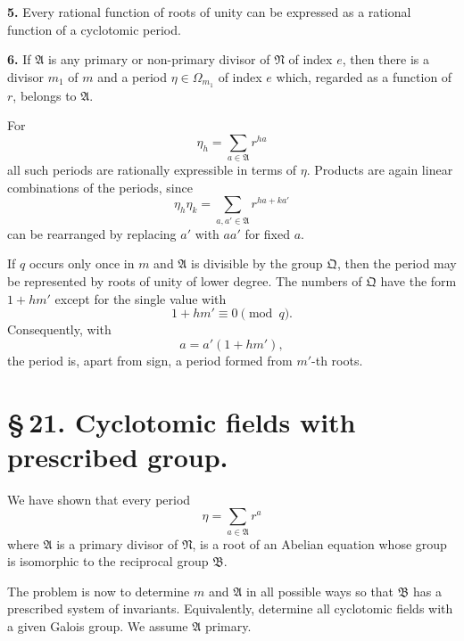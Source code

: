 \documentclass[11pt]{article}
\providecommand{\grpA}{\mathfrak A}
\providecommand{\grpB}{\mathfrak B}
\providecommand{\grpN}{\mathfrak N}
\providecommand{\grpQ}{\mathfrak Q}
\begin{document}
\medskip
\noindent\textbf{5.} Every rational function of roots of unity can be expressed as a rational function of a cyclotomic period.

\medskip
\noindent\textbf{6.} If $\grpA$ is any primary or non-primary divisor of $\grpN$ of index $e$, then there is a divisor $m_1$ of $m$ and a period $\eta\in\Omega_{m_1}$ of index $e$ which, regarded as a function of $r$, belongs to $\grpA$.

For
\[
 \eta_h=\sum_{a\in\grpA}r^{ha}
\]
all such periods are rationally expressible in terms of $\eta$. Products are again linear combinations of the periods, since
\[
 \eta_h\eta_k=\sum_{a,a'\in\grpA}r^{ha+ka'}
\]
can be rearranged by replacing $a'$ with $aa'$ for fixed $a$.

If $q$ occurs only once in $m$ and $\grpA$ is divisible by the group $\grpQ$, then the period may be represented by roots of unity of lower degree. The numbers of $\grpQ$ have the form $1+hm'$ except for the single value with
\begin{equation}
 1+hm'\equiv0\pmod q.
\tag{18}
\end{equation}
Consequently, with
\begin{equation}
 a=a'(1+hm'),
\tag{19}
\end{equation}
the period is, apart from sign, a period formed from $m'$-th roots.

\section*{\S\,21. Cyclotomic fields with prescribed group.}

We have shown that every period
\[
 \eta=\sum_{a\in\grpA}r^a
\]
where $\grpA$ is a primary divisor of $\grpN$, is a root of an Abelian equation whose group is isomorphic to the reciprocal group $\grpB$.

The problem is now to determine $m$ and $\grpA$ in all possible ways so that $\grpB$ has a prescribed system of invariants. Equivalently, determine all cyclotomic fields with a given Galois group. We assume $\grpA$ primary.
\end{document}
